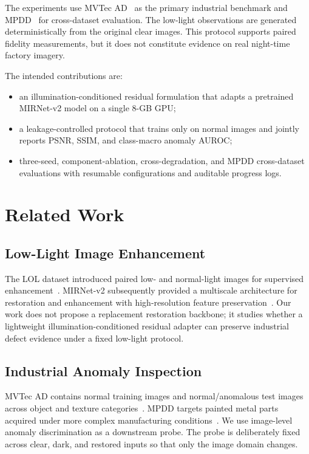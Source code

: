 \documentclass[10pt,journal]{IEEEtran}
\begin{document}
The experiments use MVTec AD~\cite{bergmann2019mvtecad} as the primary industrial benchmark and MPDD~\cite{jezek2021mpdd} for cross-dataset evaluation. The low-light observations are generated deterministically from the original clear images. This protocol supports paired fidelity measurements, but it does not constitute evidence on real night-time factory imagery.

The intended contributions are:
\begin{itemize}
    \item an illumination-conditioned residual formulation that adapts a pretrained MIRNet-v2 model on a single 8-GB GPU;
    \item a leakage-controlled protocol that trains only on normal images and jointly reports PSNR, SSIM, and class-macro anomaly AUROC;
    \item three-seed, component-ablation, cross-degradation, and MPDD cross-dataset evaluations with resumable configurations and auditable progress logs.
\end{itemize}

\section{Related Work}
\subsection{Low-Light Image Enhancement}
The LOL dataset introduced paired low- and normal-light images for supervised enhancement~\cite{wei2018retinex}. MIRNet-v2 subsequently provided a multiscale architecture for restoration and enhancement with high-resolution feature preservation~\cite{zamir2023mirnetv2}. Our work does not propose a replacement restoration backbone; it studies whether a lightweight illumination-conditioned residual adapter can preserve industrial defect evidence under a fixed low-light protocol.

\subsection{Industrial Anomaly Inspection}
MVTec AD contains normal training images and normal/anomalous test images across object and texture categories~\cite{bergmann2019mvtecad}. MPDD targets painted metal parts acquired under more complex manufacturing conditions~\cite{jezek2021mpdd}. We use image-level anomaly discrimination as a downstream probe. The probe is deliberately fixed across clear, dark, and restored inputs so that only the image domain changes.
\end{document}
